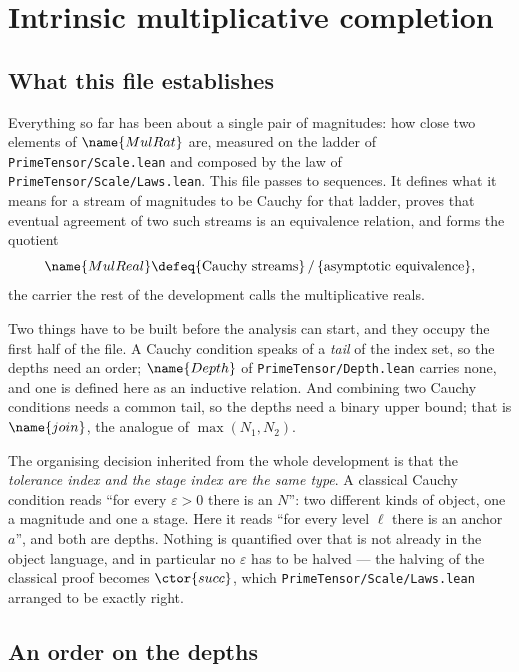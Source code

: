 
\section{Intrinsic multiplicative completion}
\label{Completion:sec}


\subsection*{What this file establishes}

Everything so far has been about a single pair of magnitudes: how close two
elements of $\name{MulRat}$ are, measured on the ladder of
\texttt{PrimeTensor/Scale.lean} and composed by the law of
\texttt{PrimeTensor/Scale/Laws.lean}.  This file passes to sequences.  It
defines what it means for a stream of magnitudes to be Cauchy for that ladder,
proves that eventual agreement of two such streams is an equivalence relation,
and forms the quotient
\[
  \name{MulReal} \defeq
    \{\text{Cauchy streams}\} \,/\, \{\text{asymptotic equivalence}\},
\]
the carrier the rest of the development calls the multiplicative reals.

Two things have to be built before the analysis can start, and they occupy the
first half of the file.  A Cauchy condition speaks of a \emph{tail} of the
index set, so the depths need an order; $\name{Depth}$ of
\texttt{PrimeTensor/Depth.lean} carries none, and one is defined here as an
inductive relation.  And combining two Cauchy conditions needs a common tail,
so the depths need a binary upper bound; that is $\name{join}$, the analogue of
$\max(N_1, N_2)$.

The organising decision inherited from the whole development is that the
\emph{tolerance index and the stage index are the same type}.  A classical
Cauchy condition reads ``for every $\varepsilon > 0$ there is an $N$'': two
different kinds of object, one a magnitude and one a stage.  Here it reads
``for every level $\ell$ there is an anchor $a$'', and both are depths.  Nothing
is quantified over that is not already in the object language, and in
particular no $\varepsilon$ has to be halved --- the halving of the classical
proof becomes $\ctor{succ}$, which
\texttt{PrimeTensor/Scale/Laws.lean} arranged to be exactly right.

\subsection{An order on the depths}

